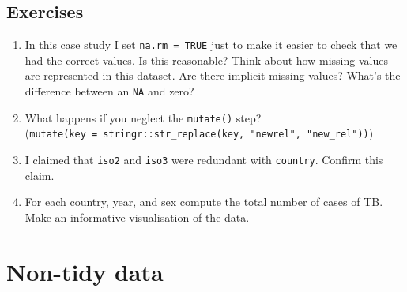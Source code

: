 \documentclass[]{book}
\newenvironment{Shaded}{\begin{snugshade}}{\end{snugshade}}
\newcommand{\KeywordTok}[1]{\textcolor[rgb]{0.13,0.29,0.53}{\textbf{{#1}}}}
\newcommand{\DataTypeTok}[1]{\textcolor[rgb]{0.13,0.29,0.53}{{#1}}}
\newcommand{\DecValTok}[1]{\textcolor[rgb]{0.00,0.00,0.81}{{#1}}}
\newcommand{\StringTok}[1]{\textcolor[rgb]{0.31,0.60,0.02}{{#1}}}
\newcommand{\OtherTok}[1]{\textcolor[rgb]{0.56,0.35,0.01}{{#1}}}
\newcommand{\NormalTok}[1]{{#1}}
\begin{document}
\begin{Shaded}
\end{Shaded}

\subsection{Exercises}\label{exercises-25}

\begin{enumerate}
\def\labelenumi{\arabic{enumi}.}
\item
  In this case study I set \texttt{na.rm\ =\ TRUE} just to make it
  easier to check that we had the correct values. Is this reasonable?
  Think about how missing values are represented in this dataset. Are
  there implicit missing values? What's the difference between an
  \texttt{NA} and zero?
\item
  What happens if you neglect the \texttt{mutate()} step?
  (\texttt{mutate(key\ =\ stringr::str\_replace(key,\ "newrel",\ "new\_rel"))})
\item
  I claimed that \texttt{iso2} and \texttt{iso3} were redundant with
  \texttt{country}. Confirm this claim.
\item
  For each country, year, and sex compute the total number of cases of
  TB. Make an informative visualisation of the data.
\end{enumerate}

\section{Non-tidy data}\label{non-tidy-data}
\end{document}
